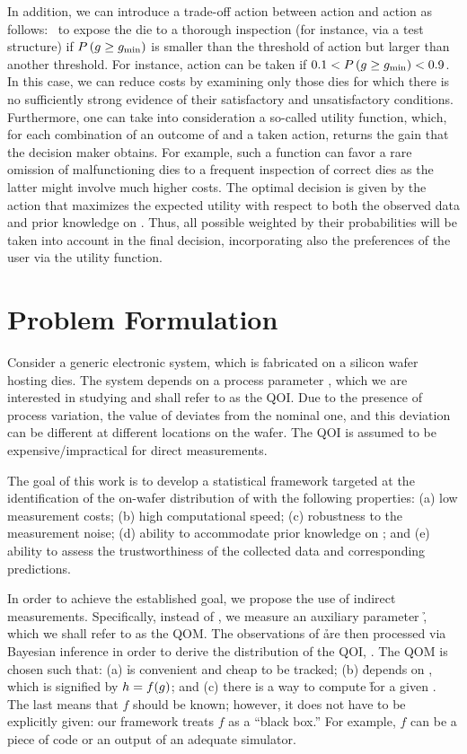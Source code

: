 In addition, we can introduce a trade-off action between action \one and action
\two as follows: \three~to expose the die to a thorough inspection (for
instance, via a test structure) if $P\left(g \geq g_{\mathrm{min}}\right)$ is
smaller than the threshold of action \one but larger than another threshold. For
instance, action \three can be taken if $0.1 < P\left(g \geq g_{\mathrm{min}}\right)
< 0.9$. In this case, we can reduce costs by examining only those dies for which
there is no sufficiently strong evidence of their satisfactory and
unsatisfactory conditions. Furthermore, one can take into consideration a
so-called utility function, which, for each combination of an outcome of \g and
a taken action, returns the gain that the decision maker obtains. For example,
such a function can favor a rare omission of malfunctioning dies to a frequent
inspection of correct dies as the latter might involve much higher costs. The
optimal decision is given by the action that maximizes the expected utility with
respect to both the observed data and prior knowledge on \g. Thus, all possible
\g weighted by their probabilities will be taken into account in the final
decision, incorporating also the preferences of the user via the utility
function.

\section{Problem Formulation}

Consider a generic electronic system, which is fabricated on a silicon wafer
hosting \nd dies. The system depends on a process parameter \g, which we are
interested in studying and shall refer to as the \ac{QOI}. Due to the presence
of process variation, the value of \g deviates from the nominal one, and this
deviation can be different at different locations on the wafer. The \ac{QOI} is
assumed to be expensive/impractical for direct measurements.

The goal of this work is to develop a statistical framework targeted at the
identification of the on-wafer distribution of \g with the following properties:
(a) low measurement costs; (b) high computational speed; (c) robustness to the
measurement noise; (d) ability to accommodate prior knowledge on \g; and (e)
ability to assess the trustworthiness of the collected data and corresponding
predictions.

In order to achieve the established goal, we propose the use of indirect
measurements. Specifically, instead of \g, we measure an auxiliary parameter \h,
which we shall refer to as the \ac{QOM}. The observations of \h are then
processed via Bayesian inference in order to derive the distribution of the
\ac{QOI}, \g. The \ac{QOM} is chosen such that: (a) \h is convenient and cheap
to be tracked; (b) \h depends on \g, which is signified by $h = f(g)$; and (c)
there is a way to compute \h for a given \g. The last means that $f$ should be
known; however, it does not have to be explicitly given: our framework treats
$f$ as a ``black box.'' For example, $f$ can be a piece of code or an output of
an adequate simulator.

